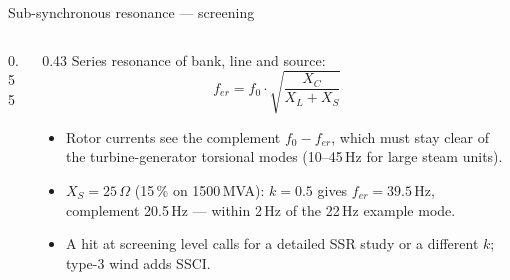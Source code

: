 \begin{frame}{Sub-synchronous resonance --- screening}
  \begin{columns}[c,onlytextwidth]
    \begin{column}{0.55\textwidth}\centering
    \end{column}
    \begin{column}{0.43\textwidth}
      \setlength{\abovedisplayskip}{4pt}\setlength{\belowdisplayskip}{4pt}
      {\small Series resonance of bank, line and source:}
      \[ f_{er} = f_0\cdot\sqrt{\frac{X_C}{X_L + X_S}} \]
      {\small
      \begin{itemize}
        \setlength{\itemsep}{0.3em}
        \item Rotor currents see the complement $f_0 - f_{er}$, which must
              stay clear of the turbine-generator torsional modes
              (10--45\,Hz for large steam units).
        \item $X_S = 25\,\Omega$ (15\,\% on 1500\,MVA): $k=0.5$ gives
              $f_{er}=39.5$\,Hz, complement 20.5\,Hz --- within 2\,Hz of
              the 22\,Hz example mode.
        \item A hit at screening level calls for a detailed SSR study or a
              different $k$; type-3 wind adds SSCI.
      \end{itemize}}
    \end{column}
  \end{columns}
\end{frame}

